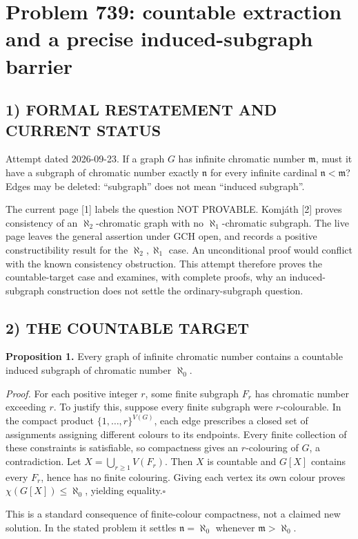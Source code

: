 \section{Problem 739: countable extraction and a precise induced-subgraph barrier}
\subsection*{1) FORMAL RESTATEMENT AND CURRENT STATUS}
Attempt dated 2026-09-23. If a graph $G$ has infinite chromatic number $\mathfrak m$, must it have a subgraph of chromatic number exactly $\mathfrak n$ for every infinite cardinal $\mathfrak n<\mathfrak m$? Edges may be deleted: ``subgraph'' does not mean ``induced subgraph''.

The current page [1] labels the question NOT PROVABLE. Komj\'ath [2] proves consistency of an $\aleph_2$-chromatic graph with no $\aleph_1$-chromatic subgraph. The live page leaves the general assertion under GCH open, and records a positive constructibility result for the $\aleph_2,\aleph_1$ case. An unconditional proof would conflict with the known consistency obstruction. This attempt therefore proves the countable-target case and examines, with complete proofs, why an induced-subgraph construction does not settle the ordinary-subgraph question.

\subsection*{2) THE COUNTABLE TARGET}
\textbf{Proposition 1.} Every graph of infinite chromatic number contains a countable induced subgraph of chromatic number $\aleph_0$.

\emph{Proof.} For each positive integer $r$, some finite subgraph $F_r$ has chromatic number exceeding $r$. To justify this, suppose every finite subgraph were $r$-colourable. In the compact product $\{1,\ldots,r\}^{V(G)}$, each edge prescribes a closed set of assignments assigning different colours to its endpoints. Every finite collection of these constraints is satisfiable, so compactness gives an $r$-colouring of $G$, a contradiction. Let $X=\bigcup_{r\ge1}V(F_r)$. Then $X$ is countable and $G[X]$ contains every $F_r$, hence has no finite colouring. Giving each vertex its own colour proves $\chi(G[X])\le\aleph_0$, yielding equality.\hfill$\square$

This is a standard consequence of finite-colour compactness, not a claimed new solution. In the stated problem it settles $\mathfrak n=\aleph_0$ whenever $\mathfrak m>\aleph_0$.


